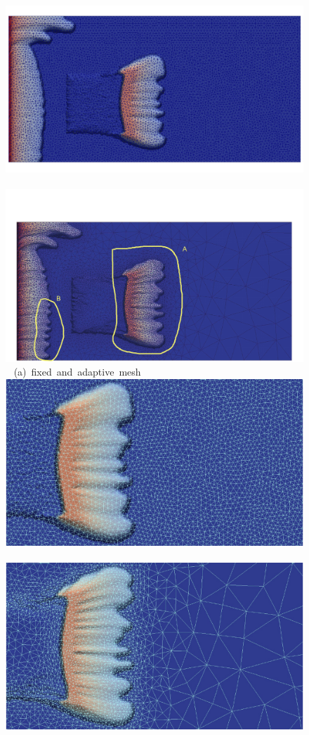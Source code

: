   \begin{figure}[ht]
  \vbox{\vspace{-.5cm}
      \hbox{\includegraphics[width=.5\textwidth, height=0.3\textwidth,clip]{./Pics1/Section4_4/5r_po_left_inlet_D250_meshb.pdf}
            \includegraphics[width=.5\textwidth, height=0.33\textwidth,clip]{./Pics1/Section4_4/5r_po_left_inlet_adapt_D250_edb.pdf} }
      \vspace{-0.cm}\hbox{\hspace{4.5cm}(a) fixed and adaptive mesh  }\vspace{-0.cm}
      \hbox{ \includegraphics[width=.5\textwidth, height=0.3\textwidth,clip]{./Pics1/Section4_4/5r_po_left_inlet_D251_Zoom1b.pdf}
             \includegraphics[width=.5\textwidth, height=0.3\textwidth,clip]{./Pics1/Section4_4/5r_po_left_inlet_adapt_D251_Zoom1b.pdf} }
}
\end{figure}
